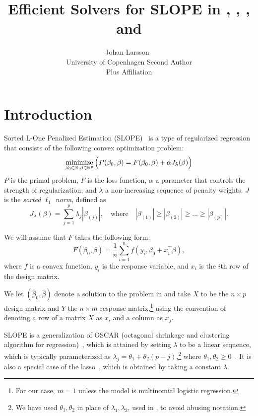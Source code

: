 \documentclass[article]{jss}
\author{Johan Larsson~\orcidlink{0000-0002-4029-5945}\\University of Copenhagen
   \And Second Author\\Plus Affiliation}
\title{Efficient Solvers for SLOPE in \proglang{R}, \proglang{Python}, \proglang{Julia}, and \proglang{C++}}
\let\Cref\crtCref
\begin{document}
\section{Introduction}

Sorted L-One Penalized Estimation
(SLOPE)~\citep{bogdan2013,zeng2014,bogdan2015} is a type of
regularized regression that consists of the following convex optimization problem:
\begin{equation}
  \label{eq:slope}
  \operatorname*{minimize}_{\beta_0 \in \mathbb{R},\beta \in \mathbb{R}^p}
  \Big(
  P(\beta_0,\beta)
  = F(\beta_0, \beta) + \alpha J_{\lambda}(\beta)
  \Big)
\end{equation}
\(P\) is the primal problem, \(F\) is the loss function, \(\alpha\) a parameter
that controls the strength of regularization, and \(\lambda\) a non-increasing sequence of penalty weights. \(J\) is the
\emph{sorted $\ell_1$ norm}, defined as
\begin{equation}
  \label{eq:sl1}
  J_{\lambda}(\beta) = \sum_{j=1}^p \lambda_j |\beta_{(j)}|, \quad
  \text{where}\quad |\beta_{(1)}| \geq |\beta_{(2)}| \geq \ldots \geq
  |\beta_{(p)}|.
\end{equation}

We will assume that \(F\) takes the following form:
\[
  F(\beta_0, \beta) = \frac{1}{n} \sum_{i=1}^n f(y_i, \beta_0 + x_i^\intercal \beta),
\]
where \(f\) is a convex function, \(y_i\) is the response variable, and
\(x_i\) is the \(i\)th row of the design matrix.

We let \((\hat{\beta}_0, \hat{\beta})\) denote a solution to the problem in \Cref{eq:slope}
and take \(X\) to be the \(n \times p\) design matrix and \(Y\) the
\(n \times m\) response matrix,\footnote{For our case, \(m = 1\) unless
  the model is multinomial logistic regression.} using the convention
of denoting a row of a matrix \(X\) as \(x_i\) and a column as \(x_j\).

SLOPE is a generalization of OSCAR (octagonal shrinkage and clustering
algorithm for regression)~\citep{bondell2008}, which is attained by
setting \(\lambda\) to be a linear sequence, which is typically parameterized as
\(\lambda_j = \theta_1 + \theta_2(p - j)\),\footnote{We have used \(\theta_1,\theta_2\) in place of
  \(\lambda_1,\lambda_2\), used in \citet{bondell2008}, to avoid abusing notation.} where \(\theta_1, \theta_2
\geq 0\)~\citep{figueiredo2014}. It is also a special case of
the lasso~\citep{santosa1986,donoho1994,donoho1995,tibshirani1996},
which is obtained by taking a constant \(\lambda\).
\end{document}
